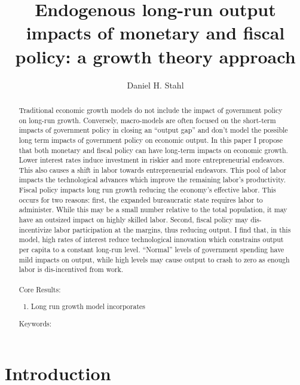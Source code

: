 \documentclass[12pt]{article}
\theoremstyle{definition}
\begin{document}
\title{Endogenous long-run output impacts of monetary and fiscal policy: a growth theory approach}
\date{}
\author{Daniel H. Stahl}

\maketitle

\newpage
 \begin{abstract}

Traditional economic growth models do not include the impact of government policy on long-run growth.  Conversely, macro-models are often focused on the short-term impacts of government policy in closing an ``output gap'' and don't model the possible long term impacts of government policy on economic output.  In this paper I propose that both monetary and fiscal policy can have long-term impacts on economic growth.  Lower interest rates induce investment in riskier and more entrepreneurial endeavors.  This also causes a shift in labor towards entrepreneurial endeavors.  This pool of labor impacts the technological advances which improve the remaining labor's productivity.  Fiscal policy impacts long run growth reducing the economy's effective labor.  This occurs for two reasons: first, the expanded bureaucratic state requires labor to administer.  While this may be a small number relative to the total population, it may have an outsized impact on highly skilled labor.  Second, fiscal policy may dis-incentivize labor participation at the margins, thus reducing output.  I find that, in this model, high rates of interest reduce technological innovation which constrains output per capita to a constant long-run level.  ``Normal'' levels of government spending have mild impacts on output, while high levels may cause output to crash to zero as enough labor is dis-incentived from work.   
\\
\\
Core Results:
\begin{enumerate}
\item Long run growth model incorporates

\end{enumerate}

Keywords: 
\end{abstract}


\newpage
\section{Introduction}
\end{document}
